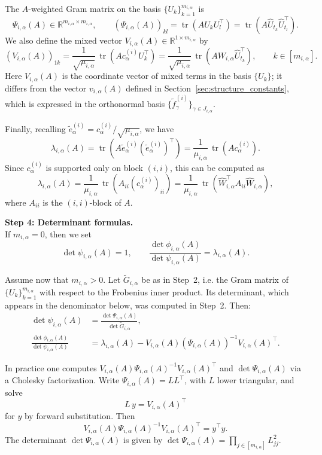 \documentclass[12pt]{amsart}
\theoremstyle{plain}
\theoremstyle{definition}
\theoremstyle{remark}
\newcommand{\R}{\mathbb{R}}
\newcommand{\1}{\mathbf{1}}
\newcommand{\tr}{\operatorname{tr}}
\begin{document}
The $A$-weighted Gram matrix on the basis $\{U_k\}_{k=1}^{m_{i,\alpha}}$ is
\[
  \Psi_{i,\alpha}(A) \in \R^{m_{i,\alpha}\times m_{i,\alpha}},
  \qquad
  (\Psi_{i,\alpha}(A))_{kl}
  = \tr(A U_k U_l^\top)
  = \tr(A \widehat U_{t_k} \widehat U_{t_l}^\top).
\]
We also define the mixed vector
$V_{i,\alpha}(A)\in\R^{1\times m_{i,\alpha}}$ by
\[
  (V_{i,\alpha}(A))_{1k}
  = \frac{1}{\sqrt{\mu_{i,\alpha}}}\,\tr(A c_\alpha^{(i)} U_k^\top)
  = \frac{1}{\sqrt{\mu_{i,\alpha}}}\,
    \tr(A W_{i,\alpha} \widehat U_{t_k}^\top),
  \qquad k\in[m_{i,\alpha}].
\]
Here $V_{i,\alpha}(A)$ is the coordinate vector of mixed terms in the basis $\{U_k\}$; it differs from the vector $v_{i,\alpha}(A)$ defined in Section~\ref{sec:structure_constants}, which is expressed in the orthonormal basis $\{\tilde f_\gamma^{(i)}\}_{\gamma\in J_{i,\alpha}}$.

Finally, recalling $\tilde e^{(i)}_\alpha = c_\alpha^{(i)}/\sqrt{\mu_{i,\alpha}}$, we have
\[
  \lambda_{i,\alpha}(A)
  = \tr(A \tilde e^{(i)}_\alpha (\tilde e^{(i)}_\alpha)^\top)
  = \frac{1}{\mu_{i,\alpha}}\,\tr(Ac_\alpha^{(i)}).
\]
Since $c_\alpha^{(i)}$ is supported only on block $(i,i)$, this can be computed as
\[
  \lambda_{i,\alpha}(A)
  = \frac{1}{\mu_{i,\alpha}}\,\tr(A_{ii} (c_\alpha^{(i)})_{ii})
  = \frac{1}{\mu_{i,\alpha}}\,\tr(\widehat W_{i,\alpha}^\top A_{ii}
                             \widehat W_{i,\alpha}),
\]
where $A_{ii}$ is the $(i,i)$-block of $A$.


\noindent\textbf{Step 4: Determinant formulas.}\\
If $m_{i,\alpha}=0$, then we set
\[
  \det \psi_{i,\alpha}(A) = 1,
  \qquad
  \frac{\det \phi_{i,\alpha}(A)}{\det \psi_{i,\alpha}(A)}
  = \lambda_{i,\alpha}(A).
\]

Assume now that $m_{i,\alpha}>0$.
Let $\widetilde G_{i,\alpha}$ be as in Step~2, i.e. the Gram matrix of
$\{U_k\}_{k=1}^{m_{i,\alpha}}$ with respect to the Frobenius inner product.
Its determinant, which appears in the denominator below, was computed in
Step~2. Then:
\begin{align*}
  \det \psi_{i,\alpha}(A)
  &= \frac{\det \Psi_{i,\alpha}(A)}
          {\det \widetilde G_{i,\alpha}},\\[0.4em]
  \frac{\det \phi_{i,\alpha}(A)}{\det \psi_{i,\alpha}(A)}
  &= \lambda_{i,\alpha}(A)
     - V_{i,\alpha}(A)
       (\Psi_{i,\alpha}(A))^{-1}
       V_{i,\alpha}(A)^\top.
\end{align*}

In practice one computes $V_{i,\alpha}(A)\Psi_{i,\alpha}(A)^{-1}
V_{i,\alpha}(A)^\top$ and $\det \Psi_{i,\alpha}(A)$ via a Cholesky factorization. Write
$\Psi_{i,\alpha}(A) = L L^\top$, with $L$ lower triangular, and solve
\[
  L\, y = V_{i,\alpha}(A)^\top
\]
for $y$ by forward substitution. Then
\[
  V_{i,\alpha}(A)\Psi_{i,\alpha}(A)^{-1}
  V_{i,\alpha}(A)^\top
  =y^\top y.
\]
The determinant $\det\Psi_{i,\alpha}(A)$ is given by
$\det\Psi_{i,\alpha}(A) = \prod_{j\in[m_{i,\alpha}]} L_{jj}^2$.
\end{document}
